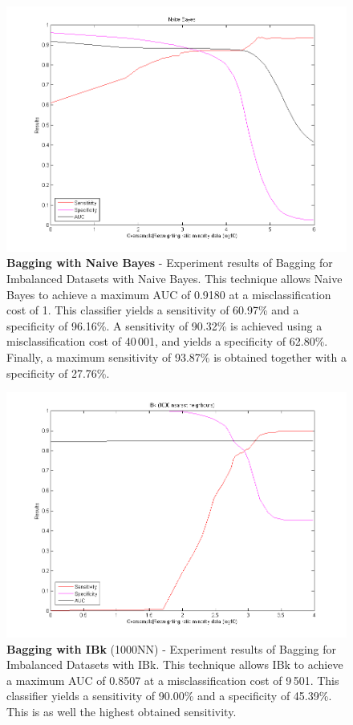 \newpage
\begin{figure}[h]
\includegraphics[scale=0.65]{img/bi_NaiveBayes.png}
\caption{\textbf{Bagging with Naive Bayes} - Experiment results of Bagging for Imbalanced Datasets with Naive Bayes. This technique allows Naive Bayes to achieve a maximum AUC of 0.9180 at a misclassification cost of 1. This classifier yields a sensitivity of 60.97\% and a specificity of 96.16\%. A sensitivity of 90.32\% is achieved using a misclassification cost of 40\,001, and yields a specificity of 62.80\%. Finally, a maximum sensitivity of 93.87\% is obtained together with a specificity of 27.76\%.}
\end{figure}

\newpage
\begin{figure}[h]
\includegraphics[scale=0.65]{img/bi_IBk-1000NN.png}
\caption{\textbf{Bagging with IBk} (1000NN) - Experiment results of Bagging for Imbalanced Datasets with IBk. This technique allows IBk to achieve a maximum AUC of 0.8507 at a misclassification cost of 9\,501. This classifier yields a sensitivity of 90.00\% and a specificity of 45.39\%. This is as well the highest obtained sensitivity.}
\end{figure}

